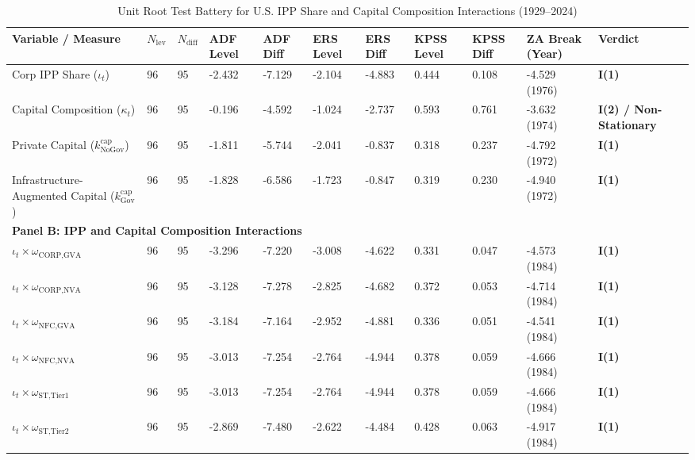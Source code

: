 \documentclass[11pt,a4paper]{article}
\begin{document}
\begin{landscape}
\begin{table}[h!]
\centering
\footnotesize
\caption{Unit Root Test Battery for U.S. IPP Share and Capital Composition Interactions (1929--2024)}
\label{tab:urca_results_ipp}
\begin{tabular}{p{6.0cm} p{0.6cm} p{0.6cm} p{1.5cm} p{1.5cm} p{1.5cm} p{1.5cm} p{1.5cm} p{1.5cm} p{2.2cm} p{2.2cm}}
\toprule
\textbf{Variable / Measure} & \textbf{$N_{\text{lev}}$} & \textbf{$N_{\text{diff}}$} & \textbf{ADF Level} & \textbf{ADF Diff} & \textbf{ERS Level} & \textbf{ERS Diff} & \textbf{KPSS Level} & \textbf{KPSS Diff} & \textbf{ZA Break (Year)} & \textbf{Verdict} \\
\midrule
Corp IPP Share ($\iota_t$) & 96 & 95 & -2.432 & -7.129 & -2.104 & -4.883 & 0.444 & 0.108 & -4.529 (1976) & \textbf{I(1)} \\
Capital Composition ($\kappa_t$) & 96 & 95 & -0.196 & -4.592 & -1.024 & -2.737 & 0.593 & 0.761 & -3.632 (1974) & \textbf{I(2) / Non-Stationary} \\
Private Capital ($k^{\text{cap}}_{\text{NoGov}}$) & 96 & 95 & -1.811 & -5.744 & -2.041 & -0.837 & 0.318 & 0.237 & -4.792 (1972) & \textbf{I(1)} \\
Infrastructure-Augmented Capital ($k^{\text{cap}}_{\text{Gov}}$) & 96 & 95 & -1.828 & -6.586 & -1.723 & -0.847 & 0.319 & 0.230 & -4.940 (1972) & \textbf{I(1)} \\
\midrule
\multicolumn{11}{l}{\textbf{Panel B: IPP and Capital Composition Interactions}} \\
\midrule
$\iota_t \times \omega_{\text{CORP,GVA}}$ & 96 & 95 & -3.296 & -7.220 & -3.008 & -4.622 & 0.331 & 0.047 & -4.573 (1984) & \textbf{I(1)} \\
$\iota_t \times \omega_{\text{CORP,NVA}}$ & 96 & 95 & -3.128 & -7.278 & -2.825 & -4.682 & 0.372 & 0.053 & -4.714 (1984) & \textbf{I(1)} \\
$\iota_t \times \omega_{\text{NFC,GVA}}$ & 96 & 95 & -3.184 & -7.164 & -2.952 & -4.881 & 0.336 & 0.051 & -4.541 (1984) & \textbf{I(1)} \\
$\iota_t \times \omega_{\text{NFC,NVA}}$ & 96 & 95 & -3.013 & -7.254 & -2.764 & -4.944 & 0.378 & 0.059 & -4.666 (1984) & \textbf{I(1)} \\
$\iota_t \times \omega_{\text{ST,Tier1}}$ & 96 & 95 & -3.013 & -7.254 & -2.764 & -4.944 & 0.378 & 0.059 & -4.666 (1984) & \textbf{I(1)} \\
$\iota_t \times \omega_{\text{ST,Tier2}}$ & 96 & 95 & -2.869 & -7.480 & -2.622 & -4.484 & 0.428 & 0.063 & -4.917 (1984) & \textbf{I(1)} \\

\end{tabular}
\end{table}
\end{landscape}
\end{document}

